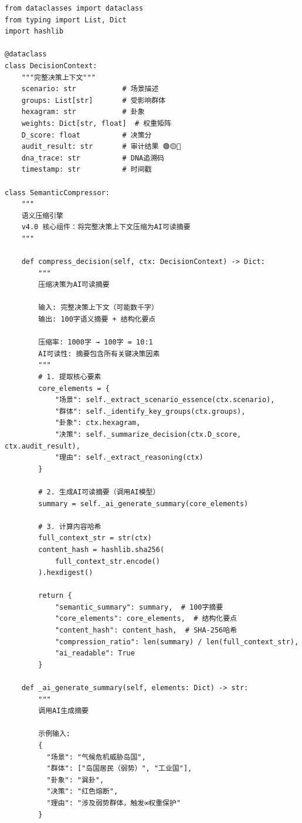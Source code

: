 \begin{lstlisting}[style=python,
  caption={语义压缩引擎（v4.0新增）
    · DNA: \#龍芯⚡️2026-03-10-SEMANTIC-v4.0},
  label={lst:semantic}]
from dataclasses import dataclass
from typing import List, Dict
import hashlib

@dataclass
class DecisionContext:
    """完整决策上下文"""
    scenario: str           # 场景描述
    groups: List[str]       # 受影响群体
    hexagram: str           # 卦象
    weights: Dict[str, float]  # 权重矩阵
    D_score: float          # 决策分
    audit_result: str       # 审计结果 🟢🟡🔴
    dna_trace: str          # DNA追溯码
    timestamp: str          # 时间戳
    
class SemanticCompressor:
    """
    语义压缩引擎
    v4.0 核心组件：将完整决策上下文压缩为AI可读摘要
    """
    
    def compress_decision(self, ctx: DecisionContext) -> Dict:
        """
        压缩决策为AI可读摘要
        
        输入: 完整决策上下文（可能数千字）
        输出: 100字语义摘要 + 结构化要点
        
        压缩率: 1000字 → 100字 = 10:1
        AI可读性: 摘要包含所有关键决策因素
        """
        # 1. 提取核心要素
        core_elements = {
            "场景": self._extract_scenario_essence(ctx.scenario),
            "群体": self._identify_key_groups(ctx.groups),
            "卦象": ctx.hexagram,
            "决策": self._summarize_decision(ctx.D_score, ctx.audit_result),
            "理由": self._extract_reasoning(ctx)
        }
        
        # 2. 生成AI可读摘要（调用AI模型）
        summary = self._ai_generate_summary(core_elements)
        
        # 3. 计算内容哈希
        full_context_str = str(ctx)
        content_hash = hashlib.sha256(
            full_context_str.encode()
        ).hexdigest()
        
        return {
            "semantic_summary": summary,  # 100字摘要
            "core_elements": core_elements,  # 结构化要点
            "content_hash": content_hash,  # SHA-256哈希
            "compression_ratio": len(summary) / len(full_context_str),
            "ai_readable": True
        }
    
    def _ai_generate_summary(self, elements: Dict) -> str:
        """
        调用AI生成摘要
        
        示例输入:
        {
          "场景": "气候危机威胁岛国",
          "群体": ["岛国居民（弱势）", "工业国"],
          "卦象": "巽卦",
          "决策": "红色熔断",
          "理由": "涉及弱势群体，触发∞权重保护"
        }
        

\end{lstlisting}
